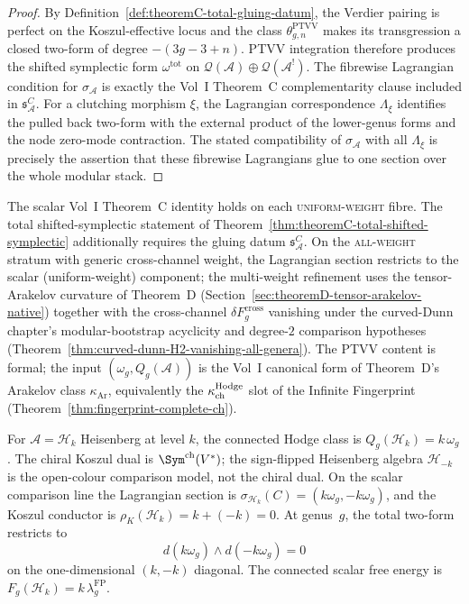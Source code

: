 \begin{proof}
By Definition~\ref{def:theoremC-total-gluing-datum}, the Verdier
pairing is perfect on the Koszul-effective locus and the class
\(\theta_{g,n}^{\mathrm{PTVV}}\) makes its transgression a closed
two-form of degree \(-(3g-3+n)\).  PTVV integration
\cite[Thm.~2.5]{PTVV13} therefore produces the shifted symplectic form
\(\omega^{\mathrm{tot}}\) on
\(\mathcal Q(\mathcal A)\oplus\mathcal Q(\mathcal A^!)\).  The
fibrewise Lagrangian condition for \(\sigma_{\mathcal A}\) is exactly
the Vol~I Theorem~C complementarity clause included in
\(\mathfrak s_{\mathcal A}^{C}\).  For a clutching morphism \(\xi\),
the Lagrangian correspondence \(\Lambda_\xi\) identifies the pulled
back two-form with the external product of the lower-genus forms and
the node zero-mode contraction.  The stated compatibility of
\(\sigma_{\mathcal A}\) with all \(\Lambda_\xi\) is precisely the
assertion that these fibrewise Lagrangians glue to one section over
the whole modular stack.
\end{proof}

\begin{remark}
\label{rem:theoremC-total-scope}
The scalar Vol~I Theorem~C identity holds on each
\textsc{uniform-weight} fibre.  The total
shifted-symplectic statement of
Theorem~\ref{thm:theoremC-total-shifted-symplectic} additionally
requires the gluing datum
\(\mathfrak s_{\mathcal A}^{C}\). On the \textsc{all-weight} stratum
with generic cross-channel weight, the Lagrangian section restricts to
the scalar (uniform-weight) component; the multi-weight refinement uses
the tensor-Arakelov curvature of Theorem~D
(Section~\ref{sec:theoremD-tensor-arakelov-native}) together with the cross-channel
$\delta F_g^{\mathrm{cross}}$ vanishing under the curved-Dunn
chapter's modular-bootstrap acyclicity and degree-\(2\)
comparison hypotheses
(Theorem~\ref{thm:curved-dunn-H2-vanishing-all-genera}). The
PTVV content is formal; the input
$(\omega_g, Q_g(\mathcal{A}))$ is the Vol~I canonical form of
Theorem~D's Arakelov class $\kappa_{\mathrm{Ar}}$, equivalently
the $\kappa_{\mathrm{ch}}^{\mathrm{Hodge}}$ slot of the Infinite Fingerprint
(Theorem~\ref{thm:fingerprint-complete-ch}).
\end{remark}

\begin{example}
\label{ex:theoremC-heisenberg}
For $\mathcal{A} = \mathcal{H}_k$ Heisenberg at level $k$,
the connected Hodge class is
$Q_g(\mathcal{H}_k)=k\,\omega_g$. The chiral Koszul dual is
$\Sym^{\mathrm{ch}}(V^*)$; the sign-flipped Heisenberg algebra
$\mathcal{H}_{-k}$ is the open-colour comparison model, not the
chiral dual. On the scalar comparison line the Lagrangian section is
$\sigma_{\mathcal{H}_k}(C)=(k\omega_g,-k\omega_g)$, and the
Koszul conductor is
$\rho_K(\mathcal{H}_k)=k+(-k)=0$.
At genus~$g$, the total two-form restricts to
\[
 d(k\omega_g)\wedge d(-k\omega_g)=0
\]
on the one-dimensional $(k,-k)$ diagonal. The connected scalar free
energy is
$F_g(\mathcal{H}_k)=k\,\lambda_g^{\mathrm{FP}}$.
\end{example}

